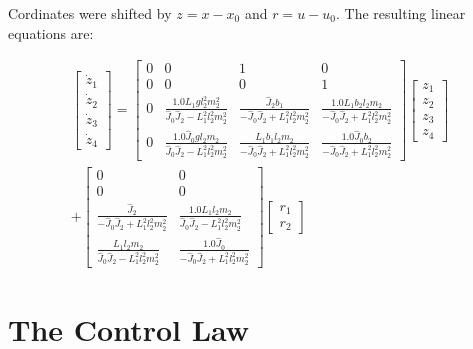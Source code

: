 \documentclass[letterpaper,10pt,oneside]{article}
\begin{document}
Cordinates were shifted by $z = x - x_{0}$ and $r = u - u_{0}$. The resulting linear equations are:

\begin{multline}
\left[\begin{matrix}
  \dot{z}_{1} \\
  \dot{z}_{2} \\
  \dot{z}_{3} \\
  \dot{z}_{4}
\end{matrix}\right]
=
  \left[\begin{matrix}
  0 & 0 & 1 & 0 \\
  0 & 0 & 0 & 1 \\
  0 & \frac{1.0 L_{1} g l_{2}^{2} m_{2}^{2}}{\hat{J}_{0} \hat{J}_{2} - L_{1}^{2} l_{2}^{2} m_{2}^{2}} & \frac{\hat{J}_{2} b_{1}}{- \hat{J}_{0} \hat{J}_{2} + L_{1}^{2} l_{2}^{2} m_{2}^{2}} & \frac{1.0 L_{1} b_{2} l_{2} m_{2}}{- \hat{J}_{0} \hat{J}_{2} + L_{1}^{2} l_{2}^{2} m_{2}^{2}} \\
  0 & \frac{1.0 \hat{J}_{0} g l_{2} m_{2}}{\hat{J}_{0} \hat{J}_{2} - L_{1}^{2} l_{2}^{2} m_{2}^{2}} & \frac{L_{1} b_{1} l_{2} m_{2}}{- \hat{J}_{0} \hat{J}_{2} + L_{1}^{2} l_{2}^{2} m_{2}^{2}} & \frac{1.0 \hat{J}_{0} b_{2}}{- \hat{J}_{0} \hat{J}_{2} + L_{1}^{2} l_{2}^{2} m_{2}^{2}}
  \end{matrix}\right]
  \left[\begin{matrix}
    z_{1} \\
    z_{2} \\
    z_{3} \\
    z_{4}
  \end{matrix}\right]
  \\
  +
  \left[\begin{matrix}
  0 & 0 \\
  0 & 0 \\
  \frac{\hat{J}_{2}}{- \hat{J}_{0} \hat{J}_{2} + L_{1}^{2} l_{2}^{2} m_{2}^{2}} & \frac{1.0 L_{1} l_{2} m_{2}}{\hat{J}_{0} \hat{J}_{2} - L_{1}^{2} l_{2}^{2} m_{2}^{2}} \\
  \frac{L_{1} l_{2} m_{2}}{\hat{J}_{0} \hat{J}_{2} - L_{1}^{2} l_{2}^{2} m_{2}^{2}} & \frac{1.0 \hat{J}_{0}}{- \hat{J}_{0} \hat{J}_{2} + L_{1}^{2} l_{2}^{2} m_{2}^{2}}
  \end{matrix}\right]
  \left[\begin{matrix}
    r_{1} \\
    r_{2}
  \end{matrix}\right]
\end{multline}


\section{The Control Law}
\end{document}
